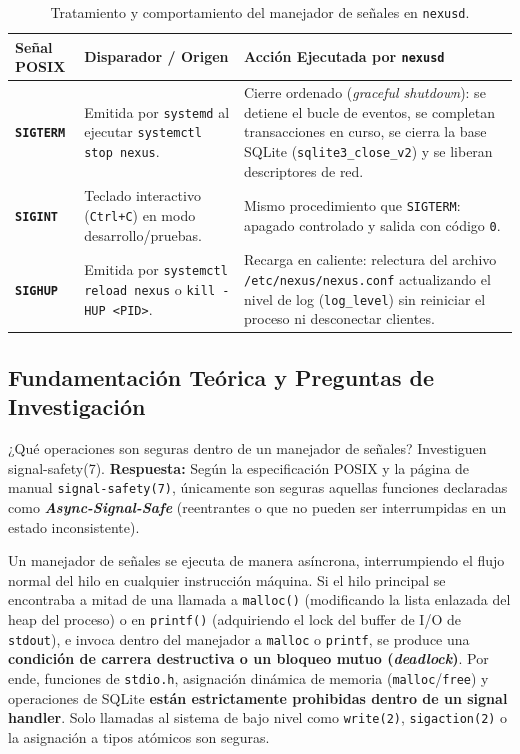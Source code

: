 \documentclass[10pt,a4paper]{article}
\begin{document}
\begin{table}[H]
    \centering
    \footnotesize
    \caption{Tratamiento y comportamiento del manejador de señales en \texttt{nexusd}.}
    \label{tab:senales}
    \begin{tabularx}{\textwidth}{llX}
        \toprule
        \rowcolor{tableheader}
        \textbf{Señal POSIX} & \textbf{Disparador / Origen} & \textbf{Acción Ejecutada por \texttt{nexusd}} \\
        \midrule
        \textbf{\texttt{SIGTERM}} & Emitida por \texttt{systemd} al ejecutar \texttt{systemctl stop nexus}. & Cierre ordenado (\textit{graceful shutdown}): se detiene el bucle de eventos, se completan transacciones en curso, se cierra la base SQLite (\texttt{sqlite3\_close\_v2}) y se liberan descriptores de red. \\
        \rowcolor{rowalt}
        \textbf{\texttt{SIGINT}} & Teclado interactivo (\texttt{Ctrl+C}) en modo desarrollo/pruebas. & Mismo procedimiento que \texttt{SIGTERM}: apagado controlado y salida con código \texttt{0}. \\
        \textbf{\texttt{SIGHUP}} & Emitida por \texttt{systemctl reload nexus} o \texttt{kill -HUP <PID>}. & Recarga en caliente: relectura del archivo \texttt{/etc/nexus/nexus.conf} actualizando el nivel de log (\texttt{log\_level}) sin reiniciar el proceso ni desconectar clientes. \\
        \bottomrule
    \end{tabularx}
\end{table}

\subsection{Fundamentación Teórica y Preguntas de Investigación}

\begin{pregunta}{¿Qué operaciones son seguras dentro de un manejador de señales? Investiguen signal-safety(7).}
    \textbf{Respuesta:} Según la especificación POSIX y la página de manual \texttt{signal-safety(7)}, únicamente son seguras aquellas funciones declaradas como \textbf{\textit{Async-Signal-Safe}} (reentrantes o que no pueden ser interrumpidas en un estado inconsistente).
    
    Un manejador de señales se ejecuta de manera asíncrona, interrumpiendo el flujo normal del hilo en cualquier instrucción máquina. Si el hilo principal se encontraba a mitad de una llamada a \texttt{malloc()} (modificando la lista enlazada del heap del proceso) o en \texttt{printf()} (adquiriendo el lock del buffer de I/O de \texttt{stdout}), e invoca dentro del manejador a \texttt{malloc} o \texttt{printf}, se produce una \textbf{condición de carrera destructiva o un bloqueo mutuo (\textit{deadlock})}. Por ende, funciones de \texttt{stdio.h}, asignación dinámica de memoria (\texttt{malloc}/\texttt{free}) y operaciones de SQLite \textbf{están estrictamente prohibidas dentro de un signal handler}. Solo llamadas al sistema de bajo nivel como \texttt{write(2)}, \texttt{sigaction(2)} o la asignación a tipos atómicos son seguras.
\end{pregunta}
\end{document}
